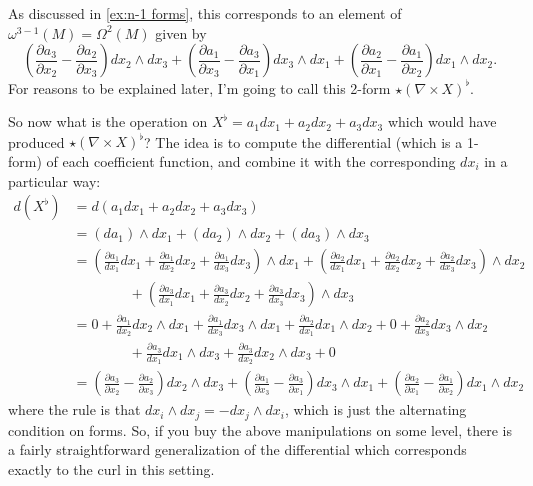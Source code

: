 As discussed in \cref{ex:n-1 forms}, this corresponds to an element of $\omega^{3-1}(M) = \Omega^2(M)$ given by
\[
	\left(\frac{\partial a_3}{\partial x_2} - \frac{\partial a_2}{\partial x_3} \right)dx_2 \wedge dx_3 + \left( \frac{\partial a_1}{\partial x_3} - \frac{\partial a_3}{\partial x_1} \right) dx_3 \wedge dx_1 + \left( \frac{\partial a_2}{\partial x_1} - \frac{\partial a_1}{\partial x_2} \right) dx_1 \wedge dx_2.
\]
For reasons to be explained later, I'm going to call this 2-form $\star (\nabla \times X)^\flat$.

So now what is the operation on $X^\flat = a_1 dx_1 + a_2 dx_2 + a_3 dx_3$ which would have produced $\star (\nabla \times X)^\flat$? The idea is to compute the differential (which is a 1-form) of each coefficient function, and combine it with the corresponding $dx_i$ in a particular way:
\begin{align*}
	d(X^\flat) & = d(a_1 dx_1 + a_2 dx_2 + a_3 dx_3) \\
	& = (da_1) \wedge dx_1 + (da_2) \wedge dx_2 + (da_3) \wedge dx_3 \\
	& = \left( \frac{\partial a_1}{dx_1} dx_1  + \frac{\partial a_1}{dx_2} dx_2 + \frac{\partial a_1}{dx_3} dx_3 \right)\wedge dx_1 + \left( \frac{\partial a_2}{dx_1} dx_1  + \frac{\partial a_2}{dx_2} dx_2 + \frac{\partial a_2}{dx_3} dx_3 \right)\wedge dx_2 \\
	& \qquad \qquad + \left( \frac{\partial a_3}{dx_1} dx_1  + \frac{\partial a_3}{dx_2} dx_2 + \frac{\partial a_3}{dx_3} dx_3 \right)\wedge dx_3 \\
	& = 0 + \frac{\partial a_1}{dx_2} dx_2 \wedge dx_1 + \frac{\partial a_1}{dx_3} dx_3 \wedge dx_1 + \frac{\partial a_2}{dx_1} dx_1 \wedge dx_2 + 0 + \frac{\partial a_2}{dx_3} dx_3 \wedge dx_2 \\
	& \qquad \qquad + \frac{\partial a_3}{dx_1} dx_1 \wedge dx_3 + \frac{\partial a_3}{dx_2} dx_2 \wedge dx_3 + 0 \\
	& = \left(\frac{\partial a_3}{\partial x_2} - \frac{\partial a_2}{\partial x_3} \right)dx_2 \wedge dx_3 + \left( \frac{\partial a_1}{\partial x_3} - \frac{\partial a_3}{\partial x_1} \right) dx_3 \wedge dx_1 + \left( \frac{\partial a_2}{\partial x_1} - \frac{\partial a_1}{\partial x_2} \right) dx_1 \wedge dx_2
\end{align*}
where the rule is that $dx_i \wedge dx_j = - dx_j \wedge dx_i$, which is just the alternating condition on forms. So, if you buy the above manipulations on some level, there is a fairly straightforward generalization of the differential which corresponds exactly to the curl in this setting.

